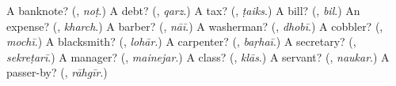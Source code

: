 \begin{tcolorbox}[breakable,colback=teal!4,colframe=teal!35!black,title={Before you move on}]
A banknote? (\textbf{}, \emph{noṭ}.) A debt? (\textbf{}, \emph{qarz}.) A tax? (\textbf{}, \emph{ṭaiks}.) A bill? (\textbf{}, \emph{bil}.) An expense? (\textbf{}, \emph{kharch}.) A barber? (\textbf{}, \emph{nāī}.) A washerman? (\textbf{}, \emph{dhobī}.) A cobbler? (\textbf{}, \emph{mochī}.) A blacksmith? (\textbf{}, \emph{lohār}.) A carpenter? (\textbf{}, \emph{baṛhaī}.) A secretary? (\textbf{}, \emph{sekreṭarī}.) A manager? (\textbf{}, \emph{mainejar}.) A class? (\textbf{}, \emph{klās}.) A servant? (\textbf{}, \emph{naukar}.) A passer-by? (\textbf{}, \emph{rāhgīr}.)
\end{tcolorbox}
